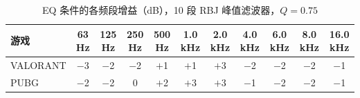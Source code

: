 \begin{table}[htbp]\centering
\caption{EQ 条件的各频段增益（dB），10 段 RBJ 峰值滤波器，$Q=0.75$}\label{tab:eq}
{\footnotesize\begin{threeparttable}
\begin{tabular}{lcccccccccc}\toprule
游戏 & 63 Hz & 125 Hz & 250 Hz & 500 Hz & 1.0 kHz & 2.0 kHz & 4.0 kHz & 6.0 kHz & 8.0 kHz & 16.0 kHz \\
\midrule
VALORANT & $-$3 & $-$2 & $-$2 & $+$1 & $+$1 & $+$3 & $-$2 & $-$2 & $-$2 & $-$1 \\
PUBG & $-$2 & $-$2 & 0 & $+$2 & $+$3 & $+$3 & $-$1 & $-$2 & $-$2 & $-$1 \\
\bottomrule\end{tabular}
\end{threeparttable}}
\end{table}
